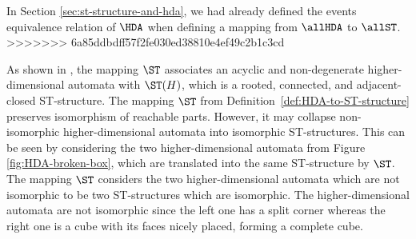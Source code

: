     In Section \ref{sec:st-structure-and-hda}, we had already defined the events equivalence relation of $\HDA$ when defining a mapping from $\allHDA$ to $\allST$.
>>>>>>> 6a85ddbdff57f2fe030ed38810e4ef49c2b1c3cd
    
    As shown in \cite[Proposition 3.42]{Johansen16STstruct}, the mapping $\ST$ associates an acyclic and non-degenerate higher-dimensional automata with $\ST(H)$, which is a rooted, connected, and adjacent-closed ST-structure. The mapping $\ST$ from Definition~\ref{def:HDA-to-ST-structure} preserves isomorphism of reachable parts. However, it may collapse non-isomorphic higher-dimensional automata into isomorphic ST-structures. This can be seen by considering the two higher-dimensional automata from Figure \ref{fig:HDA-broken-box}, which are translated into the same ST-structure by $\ST$. The mapping $\ST$ considers the two higher-dimensional automata which are not isomorphic to be two ST-structures which are isomorphic. The higher-dimensional automata are not isomorphic since the left one has a split corner whereas the right one is a cube with its faces nicely placed, forming a complete cube.



